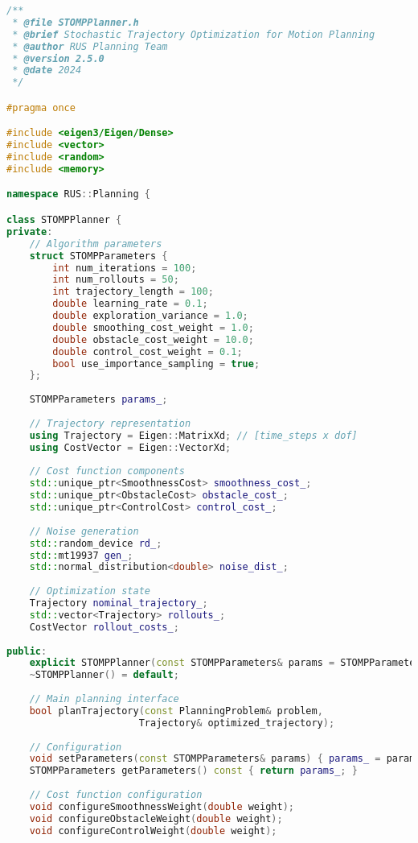 \begin{lstlisting}[language=C++, caption={STOMP Path Planning Algorithm}, label={lst:app-stomp}]
/**
 * @file STOMPPlanner.h
 * @brief Stochastic Trajectory Optimization for Motion Planning
 * @author RUS Planning Team
 * @version 2.5.0
 * @date 2024
 */

#pragma once

#include <eigen3/Eigen/Dense>
#include <vector>
#include <random>
#include <memory>

namespace RUS::Planning {

class STOMPPlanner {
private:
    // Algorithm parameters
    struct STOMPParameters {
        int num_iterations = 100;
        int num_rollouts = 50;
        int trajectory_length = 100;
        double learning_rate = 0.1;
        double exploration_variance = 1.0;
        double smoothing_cost_weight = 1.0;
        double obstacle_cost_weight = 10.0;
        double control_cost_weight = 0.1;
        bool use_importance_sampling = true;
    };
    
    STOMPParameters params_;
    
    // Trajectory representation
    using Trajectory = Eigen::MatrixXd; // [time_steps x dof]
    using CostVector = Eigen::VectorXd;
    
    // Cost function components
    std::unique_ptr<SmoothnessCost> smoothness_cost_;
    std::unique_ptr<ObstacleCost> obstacle_cost_;
    std::unique_ptr<ControlCost> control_cost_;
    
    // Noise generation
    std::random_device rd_;
    std::mt19937 gen_;
    std::normal_distribution<double> noise_dist_;
    
    // Optimization state
    Trajectory nominal_trajectory_;
    std::vector<Trajectory> rollouts_;
    CostVector rollout_costs_;
    
public:
    explicit STOMPPlanner(const STOMPParameters& params = STOMPParameters{});
    ~STOMPPlanner() = default;
    
    // Main planning interface
    bool planTrajectory(const PlanningProblem& problem, 
                       Trajectory& optimized_trajectory);
    
    // Configuration
    void setParameters(const STOMPParameters& params) { params_ = params; }
    STOMPParameters getParameters() const { return params_; }
    
    // Cost function configuration
    void configureSmoothnessWeight(double weight);
    void configureObstacleWeight(double weight);
    void configureControlWeight(double weight);


\end{lstlisting}
